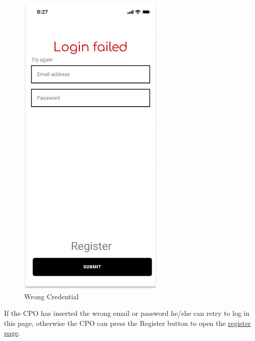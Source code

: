 \begin{figure}[H]
    \centering
    \includegraphics[keepaspectratio, height=15cm]{Mockup/CPOAppInterface/Failed Login.png}
    \caption{Wrong Credential}
    \label{site:FailedLogin}
\end{figure}
If the \ac{CPO} has inserted the wrong email or password he/she can retry to log in this page, otherwise the \ac{CPO} can press the Register button to open the \hyperref[site:Register]{register page}.
